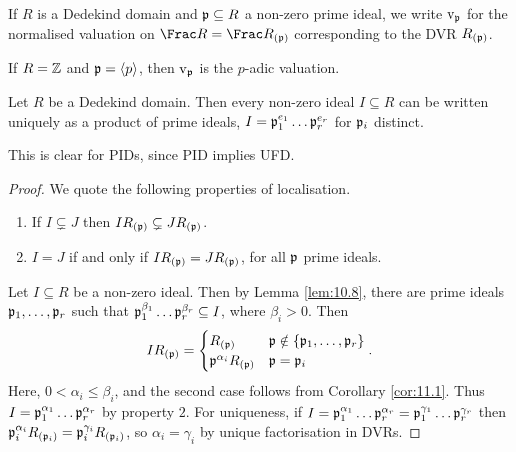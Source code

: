 \begin{definition}
If $ R $ is a Dedekind domain and $ \mathfrak{p} \subseteq R $ a non-zero prime ideal, we write $ \mathrm{v}_{\mathfrak{p}} $ for the normalised valuation on $ \Frac R = \Frac R_{\br{\ppp}} $ corresponding to the DVR $ R_{\br{\ppp}} $.
\end{definition}

\begin{example*}
If $ R = \mathbb{Z} $ and $ \mathfrak{p} = \left\langle p \right\rangle $, then $ \mathrm{v}_{\mathfrak{p}} $ is the $ p $-adic valuation.
\end{example*}

\begin{theorem}
Let $ R $ be a Dedekind domain. Then every non-zero ideal $ I \subseteq R $ can be written uniquely as a product of prime ideals, $ I = \mathfrak{p}_1^{e_1} \dots \mathfrak{p}_r^{e_r} $ for $ \mathfrak{p}_i $ distinct.
\end{theorem}

\begin{remark*}
This is clear for PIDs, since PID implies UFD.
\end{remark*}

\begin{proof}
We quote the following properties of localisation.
\begin{enumerate}
\item If $ I \subsetneq J $ then $ IR_{\br{\ppp}} \subsetneq JR_{\br{\ppp}} $.
\item $ I = J $ if and only if $ IR_{\br{\ppp}} = JR_{\br{\ppp}} $, for all $ \mathfrak{p} $ prime ideals.
\end{enumerate}
Let $ I \subseteq R $ be a non-zero ideal. Then by Lemma \ref{lem:10.8}, there are prime ideals $ \mathfrak{p}_1, \dots, \mathfrak{p}_r $ such that $ \mathfrak{p}_1^{\beta_1} \dots \mathfrak{p}_r^{\beta_r} \subseteq I $, where $ \beta_i > 0 $. Then
$$ IR_{\br{\ppp}} =
\begin{cases}
R_{\br{\ppp}} & \ppp \notin \cbr{\ppp_1, \dots, \ppp_r} \\
\ppp^{\alpha_i}R_{\br{\ppp}} & \ppp = \ppp_i
\end{cases}.
$$
Here, $ 0 < \alpha_i \le \beta_i $, and the second case follows from Corollary \ref{cor:11.1}. Thus $ I = \mathfrak{p}_1^{\alpha_1} \dots \mathfrak{p}_r^{\alpha_r} $ by property $ 2 $. For uniqueness, if $ I = \mathfrak{p}_1^{\alpha_1} \dots \mathfrak{p}_r^{\alpha_r} = \mathfrak{p}_1^{\gamma_1} \dots \mathfrak{p}_r^{\gamma_r} $ then $ \ppp_i^{\alpha_i}R_{\br{\ppp_i}} = \ppp_i^{\gamma_i}R_{\br{\ppp_i}} $, so $ \alpha_i = \gamma_i $ by unique factorisation in DVRs.
\end{proof}

